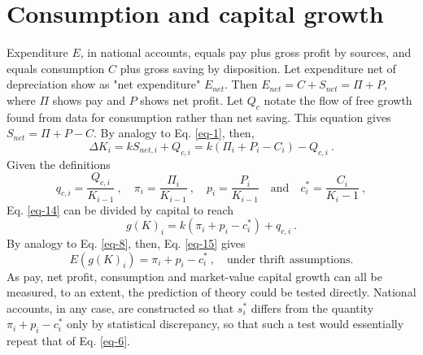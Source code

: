 \documentclass[a4paper,fleqn]{latex_styles/cas-sc}
\begin{document}
%

\FloatBarrier
%
\hypertarget{consumption-and-capital-growth}{%
\section{Consumption and capital growth}\label{consumption-and-capital-growth}}
%
Expenditure \(E\), in national accounts, equals pay plus gross profit by sources, and equals consumption \(C\) plus gross saving by disposition\footnotemark. Let expenditure net of depreciation show as "net expenditure" \(E_{net}\). Then \(E_{net} = C + S_{net} = \Pi + P\), where \(\Pi\) shows pay and \(P\) shows net profit. Let \(Q_c\) notate the flow of free growth found from data for consumption rather than net saving. This equation gives \(S_{net} = \Pi + P - C\). By analogy to Eq. \eqref{eq-1}, then,
%
%
\begin{equation}
    \Delta K_i = k S_{net,i} + Q_{c,i} = k (\Pi_i + P_i - C_i) - Q_{c,i}\ .\label{eq-14}
\end{equation}
%
Given the definitions
%
\begin{equation*}
    q_{c,i} = \frac{Q_{c,i}}{K_{i - 1}}\ , \quad \pi_i = \frac{\Pi_i}{K_{i - 1}} \ , \quad p_i = \frac{P_i}{K_{i-1}} \quad \text{and} \quad c^*_i = \frac{C_i}{K_i - 1}\ ,
\end{equation*}
%
Eq. \eqref{eq-14} can be divided by capital to reach
%
\begin{equation}
    g(K)_i = k (\pi_i + p_i - c^*_i) + q_{c,i} \ . \label{eq-15}
\end{equation}
%
By analogy to Eq. \eqref{eq-8}, then, Eq. \eqref{eq-15} gives
%
\begin{equation}
    E(g(K)_i) = \pi_i + p_i - c^*_i \ , \quad \text{under thrift assumptions.} \label{eq-16}
\end{equation}
%
As pay, net profit, consumption and market-value capital growth can all be measured, to an extent, the prediction of theory could be tested directly. National accounts, in any case, are constructed so that \(s^*_i\) differs from the quantity \(\pi_i + p_i - c^*_i\) only by statistical discrepancy, so that such a test would essentially repeat that of Eq. \eqref{eq-6}.
\end{document}
